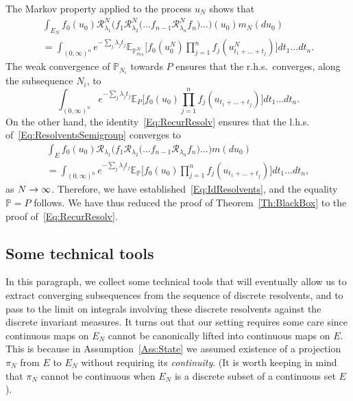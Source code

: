 \documentclass[AHL,Unicode,longabstracts]{cedram}
\theoremstyle{plain}
\newcommand{\bbE}{\mathbb{E}}
\newcommand{\bbP}{\mathbb{P}}
\newcommand{\cR}{\mathcal{R}}
\renewcommand*{\to}{\mathchoice{\longrightarrow}{\rightarrow}{\rightarrow}{\rightarrow}}
\begin{document}
The Markov property applied to the process $u_N$ shows that
\begin{multline}\label{Eq:ResolventsSemigroup}
\int_{E_N} f_0(u_0)\cR^N_{\lambda_1} \Big(f_1\cR^N_{\lambda_2} \Big(\dots f_{n-1} \cR^N_{\lambda_n} f_n\Big)\dots\Big) (u_0) m_N(du_0) \\
= \int_{(0,\infty)^n} e^{-\sum_j \lambda_j t_j} \bbE_{\bbP^{N}_{m_N}}\Big[f_0(u_0^N)\prod_{j=1}^n f_j(u_{t_1+\dots+t_j}^N)\Big] dt_1\dots dt_n .
\end{multline}
The weak convergence of $\bbP_{N_i}$ towards $P$ ensures that the r.h.s.~converges, along the subsequence $N_i$, to
\begin{equation}
\int_{(0,\infty)^n} e^{-\sum_j \lambda_j t_j} \bbE_P\Big[f_0(u_0)\prod_{j=1}^n f_j(u_{t_1+\dots+t_j})\Big] dt_1\dots dt_n .
\end{equation}
On the other hand, the identity~\eqref{Eq:RecurResolv} ensures that the l.h.s. of~\eqref{Eq:ResolventsSemigroup} converges to
\begin{multline*}
\int_E f_0(u_0) \cR_{\lambda_1} \Big(f_1 \cR_{\lambda_2} \Big(\dots f_{n-1} \cR_{\lambda_n} f_n\Big)\dots\Big) m(du_0) \\
= \int_{(0,\infty)^n} e^{-\sum_j \lambda_j t_j} \bbE_\bbP\Big[f_0(u_0)\prod_{j=1}^n f_j(u_{t_1+\dots+t_j})\Big] dt_1\dots dt_n ,
\end{multline*}
as $N\to\infty$. Therefore, we have established~\eqref{Eq:IdResolvents}, and the equality $\bbP=P$ follows. We have thus reduced the proof of Theorem~\ref{Th:BlackBox} to the proof of~\eqref{Eq:RecurResolv}.


\subsection{Some technical tools}\label{SubsectionCriterion}

In this paragraph, we collect some technical tools that will eventually allow us to extract converging subsequences from the sequence of discrete resolvents, and to pass to the limit on integrals involving these discrete resolvents against the discrete invariant measures. It turns out that our setting requires some care since continuous maps on $E_N$ cannot be canonically lifted into continuous maps on $E$. This is because in Assumption~\ref{Ass:State} we assumed existence of a projection $\pi_N$ from $E$ to $E_N$ without requiring its \emph{continuity}. (It is worth keeping in mind that $\pi_N$ cannot be continuous when $E_N$ is a discrete subset of a continuous set $E$).
\end{document}
